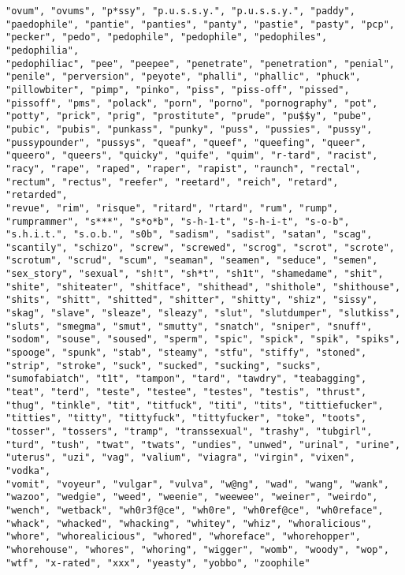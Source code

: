 \begin{lstlisting}
"ovum", "ovums", "p*ssy", "p.u.s.s.y.", "p.u.s.s.y.", "paddy",
"paedophile", "pantie", "panties", "panty", "pastie", "pasty", "pcp",
"pecker", "pedo", "pedophile", "pedophile", "pedophiles", "pedophilia",
"pedophiliac", "pee", "peepee", "penetrate", "penetration", "penial",
"penile", "perversion", "peyote", "phalli", "phallic", "phuck",
"pillowbiter", "pimp", "pinko", "piss", "piss-off", "pissed",
"pissoff", "pms", "polack", "porn", "porno", "pornography", "pot",
"potty", "prick", "prig", "prostitute", "prude", "pu$$y", "pube",
"pubic", "pubis", "punkass", "punky", "puss", "pussies", "pussy",
"pussypounder", "pussys", "queaf", "queef", "queefing", "queer",
"queero", "queers", "quicky", "quife", "quim", "r-tard", "racist",
"racy", "rape", "raped", "raper", "rapist", "raunch", "rectal",
"rectum", "rectus", "reefer", "reetard", "reich", "retard", "retarded",
"revue", "rim", "risque", "ritard", "rtard", "rum", "rump",
"rumprammer", "s***", "s*o*b", "s-h-1-t", "s-h-i-t", "s-o-b",
"s.h.i.t.", "s.o.b.", "s0b", "sadism", "sadist", "satan", "scag",
"scantily", "schizo", "screw", "screwed", "scrog", "scrot", "scrote",
"scrotum", "scrud", "scum", "seaman", "seamen", "seduce", "semen",
"sex_story", "sexual", "sh!t", "sh*t", "sh1t", "shamedame", "shit",
"shite", "shiteater", "shitface", "shithead", "shithole", "shithouse",
"shits", "shitt", "shitted", "shitter", "shitty", "shiz", "sissy",
"skag", "slave", "sleaze", "sleazy", "slut", "slutdumper", "slutkiss",
"sluts", "smegma", "smut", "smutty", "snatch", "sniper", "snuff",
"sodom", "souse", "soused", "sperm", "spic", "spick", "spik", "spiks",
"spooge", "spunk", "stab", "steamy", "stfu", "stiffy", "stoned",
"strip", "stroke", "suck", "sucked", "sucking", "sucks",
"sumofabiatch", "t1t", "tampon", "tard", "tawdry", "teabagging",
"teat", "terd", "teste", "testee", "testes", "testis", "thrust",
"thug", "tinkle", "tit", "titfuck", "titi", "tits", "tittiefucker",
"titties", "titty", "tittyfuck", "tittyfucker", "toke", "toots",
"tosser", "tossers", "tramp", "transsexual", "trashy", "tubgirl",
"turd", "tush", "twat", "twats", "undies", "unwed", "urinal", "urine",
"uterus", "uzi", "vag", "valium", "viagra", "virgin", "vixen", "vodka",
"vomit", "voyeur", "vulgar", "vulva", "w@ng", "wad", "wang", "wank",
"wazoo", "wedgie", "weed", "weenie", "weewee", "weiner", "weirdo",
"wench", "wetback", "wh0r3f@ce", "wh0re", "wh0ref@ce", "wh0reface",
"whack", "whacked", "whacking", "whitey", "whiz", "whoralicious",
"whore", "whorealicious", "whored", "whoreface", "whorehopper",
"whorehouse", "whores", "whoring", "wigger", "womb", "woody", "wop",
"wtf", "x-rated", "xxx", "yeasty", "yobbo", "zoophile"
\end{lstlisting}


